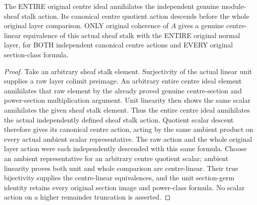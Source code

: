 \begin{theorem}
\label{hir:real-domain-actual-normal-layer-sheaf-stalk-centre-equivalence}
\leanok
The ENTIRE original centre ideal annihilates the independent genuine
module-sheaf stalk action. Its canonical centre quotient action descends
before the whole original layer comparison. ONLY original coherence of
$A$ gives a genuine centre-linear equivalence of this actual sheaf stalk
with the ENTIRE original normal layer, for BOTH independent canonical
centre actions and EVERY original section-class formula.
\end{theorem}
\begin{proof}
Take an arbitrary sheaf stalk element. Surjectivity of the actual linear
unit supplies a raw layer colimit preimage. An arbitrary entire centre
ideal element annihilates that raw element by the already proved genuine
centre-section and power-section multiplication argument. Unit linearity
then shows the same scalar annihilates the given sheaf stalk element.
Thus the entire centre ideal annihilates the actual independently
defined sheaf stalk action. Quotient scalar descent therefore gives its
canonical centre action, acting by the same ambient product on every
actual ambient scalar representative. The raw action and the whole
original layer action were each independently descended with this same
formula. Choose an ambient representative for an arbitrary centre quotient
scalar; ambient linearity proves both unit and whole comparison are
centre-linear. Their true bijectivity supplies the centre-linear
equivalences, and the unit section-germ identity retains every original
section image and power-class formula. No scalar action on a higher
remainder truncation is asserted.
\end{proof}

